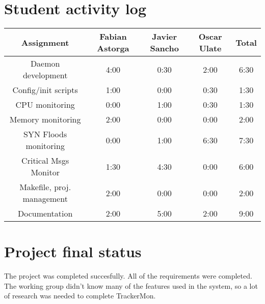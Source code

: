\documentclass[10pt]{article}
\begin{document}
\section{Student activity log}


\begin{center}
  \begin{tabular}{|c|c|c|c|c|}
        \hline
    Assignment & Fabian Astorga & Javier Sancho & Oscar Ulate & Total \\
    \hline
    \hline
    Daemon development & 4:00 & 0:30 & 2:00 & 6:30 \\
    \hline
    Config/init scripts & 1:00 & 0:00 & 0:30 & 1:30 \\
    \hline
    CPU monitoring & 0:00 & 1:00 & 0:30 & 1:30 \\
    \hline
    Memory monitoring & 2:00 & 0:00 & 0:00 & 2:00 \\
    \hline
    SYN Floods monitoring & 0:00 & 1:00 & 6:30 & 7:30 \\
    \hline
    Critical Msgs Monitor & 1:30 & 4:30 & 0:00 & 6:00 \\
    \hline
    Makefile, proj. management & 2:00 & 0:00 & 0:00 & 2:00 \\
    \hline
    Documentation & 2:00 & 5:00 & 2:00 & 9:00 \\
    \hline

  \end{tabular}
\end{center}

\section{Project final status}
The project was completed succesfully. All of the requirements were completed. The working group didn't know many of the features used in the system, so a lot of research was needed to complete TrackerMon.
\end{document}

